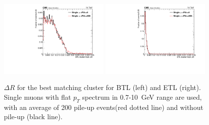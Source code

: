 \begin{figure}[!h]
\centering
\includegraphics[width=0.48\textwidth]{fig/performance/ClusterAndTracks/noPreliminary/BTLbestCluster_DR_muPUcomp-4.pdf}
\includegraphics[width=0.48\textwidth]{fig/performance/ClusterAndTracks/noPreliminary/ETLbestCluster_DR_muPUcomp-4.pdf}
\caption{$\Delta R$ for the best matching cluster for BTL (left) and ETL (right). Single muons with flat $p_{T}$ spectrum in 0.7-10~GeV range are used,  with an average of 200 pile-up events(red dotted line) and without pile-up (black line).}
\label{fig:clusterMuPuComp_DeltaR}
\end{figure}


